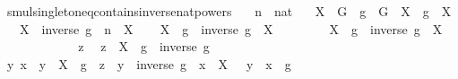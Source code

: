 \begin{isabellebody}
%
\isadelimproof
\isanewline
%
\endisadelimproof
\isanewline
{}\isamarkupfalse%
\ smul{\isacharunderscore}{\kern0pt}singleton{\isacharunderscore}{\kern0pt}eq{\isacharunderscore}{\kern0pt}contains{\isacharunderscore}{\kern0pt}inverse{\isacharunderscore}{\kern0pt}nat{\isacharunderscore}{\kern0pt}powers{\isacharcolon}{\kern0pt}\isanewline
\ \ \ n\ {\isacharcolon}{\kern0pt}{\isacharcolon}{\kern0pt}\ nat\isanewline
\ \ \ {\isachardoublequoteopen}X\ {\isasymsubseteq}\ G{\isachardoublequoteclose}\ \ {\isachardoublequoteopen}g\ {\isasymin}\ G{\isachardoublequoteclose}\ \ {\isachardoublequoteopen}X\ {\isasymcdots}\ {\isacharbraceleft}{\kern0pt}g{\isacharbraceright}{\kern0pt}\ {\isacharequal}{\kern0pt}\ X{\isachardoublequoteclose}\isanewline
\ \ \ {\isachardoublequoteopen}X\ {\isasymcdots}\ {\isacharbraceleft}{\kern0pt}{\isacharparenleft}{\kern0pt}inverse\ g{\isacharparenright}{\kern0pt}\ {\isacharcircum}{\kern0pt}\ n{\isacharbraceright}{\kern0pt}\ {\isacharequal}{\kern0pt}\ X{\isachardoublequoteclose}\isanewline
%
\isadelimproof
%
\endisadelimproof
%
\isatagproof
{}\isamarkupfalse%
{\isacharminus}{\kern0pt}\isanewline
\ \ \isamarkupfalse%
\ {\isachardoublequoteopen}{\isacharparenleft}{\kern0pt}X\ {\isasymcdots}\ {\isacharbraceleft}{\kern0pt}g{\isacharbraceright}{\kern0pt}{\isacharparenright}{\kern0pt}\ {\isasymcdots}\ {\isacharbraceleft}{\kern0pt}inverse\ g{\isacharbraceright}{\kern0pt}\ {\isacharequal}{\kern0pt}\ X{\isachardoublequoteclose}\isanewline
\ \ \isamarkupfalse%
\isanewline
\ \ \ \ \isamarkupfalse%
\ {\isachardoublequoteopen}{\isacharparenleft}{\kern0pt}X\ {\isasymcdots}\ {\isacharbraceleft}{\kern0pt}g{\isacharbraceright}{\kern0pt}{\isacharparenright}{\kern0pt}\ {\isasymcdots}\ {\isacharbraceleft}{\kern0pt}inverse\ g{\isacharbraceright}{\kern0pt}\ {\isasymsubseteq}\ X{\isachardoublequoteclose}\isanewline
\ \ \ \ \isamarkupfalse%
\isanewline
\ \ \ \ \ \ \isamarkupfalse%
\ z\ \isamarkupfalse%
\ {\isachardoublequoteopen}z\ {\isasymin}\ {\isacharparenleft}{\kern0pt}X\ {\isasymcdots}\ {\isacharbraceleft}{\kern0pt}g{\isacharbraceright}{\kern0pt}{\isacharparenright}{\kern0pt}\ {\isasymcdots}\ {\isacharbraceleft}{\kern0pt}inverse\ g{\isacharbraceright}{\kern0pt}{\isachardoublequoteclose}\isanewline
\ \ \ \ \ \ \isamarkupfalse%
\ \isamarkupfalse%
\ y\ x\ \ {\isachardoublequoteopen}y\ {\isasymin}\ X\ {\isasymcdots}\ {\isacharbraceleft}{\kern0pt}g{\isacharbraceright}{\kern0pt}{\isachardoublequoteclose}\ \ {\isachardoublequoteopen}z\ {\isacharequal}{\kern0pt}\ y\ {\isasymcdot}\ inverse\ g{\isachardoublequoteclose}\ \ {\isachardoublequoteopen}x\ {\isasymin}\ X{\isachardoublequoteclose}\ \ \ {\isachardoublequoteopen}y\ {\isacharequal}{\kern0pt}\ x\ {\isasymcdot}\ g{\isachardoublequoteclose}\ \isanewline

\end{isabellebody}
